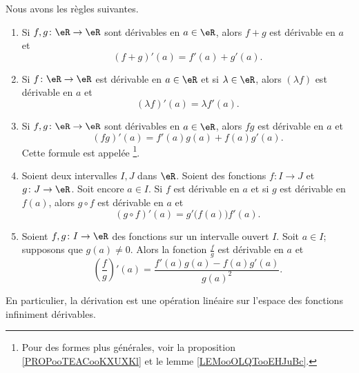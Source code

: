 \begin{proposition}        \label{PROPooOUZOooEcYKxn}
	Nous avons les règles suivantes.
	\begin{enumerate}
		\item       \label{ITEMooTFNPooYngHnD}
		      Si \( f,g\colon \eR\to \eR\) sont dérivables en \( a\in \eR\), alors \( f+g\) est dérivable en \( a\) et
		      \begin{equation}
			      (f+g)'(a)=f'(a)+g'(a).
		      \end{equation}
		\item       \label{ITEMooIPLRooOZXqMg}
		      Si \( f\colon \eR\to \eR\) est dérivable en \( a\in \eR\) et si \( \lambda\in \eR\), alors \( (\lambda f)\) est dérivable en \( a\) et
		      \begin{equation}
			      (\lambda f)'(a)=\lambda f'(a).
		      \end{equation}
		\item       \label{ITEMooMQERooBCqnvS}
		      Si \( f,g\colon \eR\to \eR\) sont dérivables en \( a\in \eR\), alors \( fg\) est dérivable en \( a\) et
		      \begin{equation}
			      (fg)'(a)=f'(a)g(a)+f(a)g'(a).
		      \end{equation}
		      Cette formule est appelée \footnote{Pour des formes plus générales, voir la proposition \ref{PROPooTEACooKXUXKl} et le lemme \ref{LEMooOLQTooEHJuBc}.}.
		\item       \label{ITEMooLYZCooVUPTyh}
		      Soient deux intervalles \( I,J\) dans \( \eR\). Soient des fonctions \( f\colon I\to J\) et \( g\colon J\to \eR\). Soit encore \( a\in I\). Si \( f\) est dérivable en \( a\) et si \( g\) est dérivable en \( f(a)\), alors \( g\circ f\) est dérivable en \( a\) et
		      \begin{equation}
			      (g\circ f)'(a)= g'\big( f(a) \big)f'(a).
		      \end{equation}
		\item       \label{ITEMooMUNQooLiKffz}
		      Soient \( f,g\colon I\to \eR\) des fonctions sur un intervalle ouvert \( I\). Soit \( a\in I\); supposons que \( g(a)\neq 0\). Alors la fonction \( \frac{ f }{ g }\) est dérivable en \( a\) et
		      \begin{equation}
			      \left( \frac{ f }{ g } \right)'(a)=\frac{ f'(a)g(a)-f(a)g'(a) }{ g(a)^2 }.
		      \end{equation}
	\end{enumerate}
	En particulier, la dérivation est une opération linéaire sur l'espace des fonctions infiniment dérivables.
\end{proposition}


